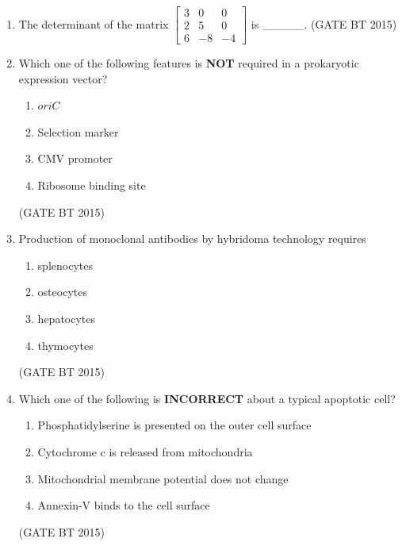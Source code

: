 \documentclass[journal,12pt,onecolumn]{IEEEtran}
\begin{document}
\begin{enumerate}[label=\textbf{Q.\arabic*}]
    \item The determinant of the matrix 
    $
    \begin{bmatrix}
    3 & 0 & 0 \\
    2 & 5 & 0 \\
    6 & -8 & -4
    \end{bmatrix}
    $
    is \_\_\_\_\_.
    \hfill (GATE BT 2015)

    \item Which one of the following features is \textbf{NOT} required in a prokaryotic expression vector?
    \begin{multicols}{4}
        \begin{enumerate}
            \item $oriC$
            \item Selection marker
            \item CMV promoter
            \item Ribosome binding site
        \end{enumerate}
    \end{multicols}             \hfill (GATE BT 2015)

    \item Production of monoclonal antibodies by hybridoma technology requires
    \begin{multicols}{4}
        \begin{enumerate}
            \item splenocytes
            \item osteocytes
            \item hepatocytes
            \item thymocytes
        \end{enumerate}
    \end{multicols}             \hfill (GATE BT 2015)

    \item Which one of the following is \textbf{INCORRECT} about a typical apoptotic cell?
        \begin{enumerate}
            \item Phosphatidylserine is presented on the outer cell surface
            \item Cytochrome c is released from mitochondria
            \item Mitochondrial membrane potential does not change
            \item Annexin-V binds to the cell surface
        \end{enumerate}
         \hfill (GATE BT 2015)



\end{enumerate}
\end{document}
